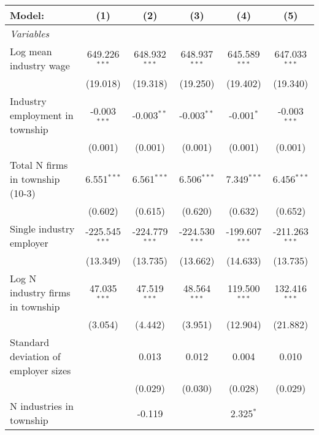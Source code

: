 \begingroup
\centering
\begin{tabular}{lccccc}
   \tabularnewline \midrule \midrule
   Model:                               & (1)              & (2)              & (3)              & (4)              & (5)\\  
   \midrule
   \emph{Variables}\\
   Log mean industry wage               & 649.226$^{***}$  & 648.932$^{***}$  & 648.937$^{***}$  & 645.589$^{***}$  & 647.033$^{***}$\\   
                                        & (19.018)         & (19.318)         & (19.250)         & (19.402)         & (19.340)\\   
   Industry employment in township      & -0.003$^{***}$   & -0.003$^{**}$    & -0.003$^{**}$    & -0.001$^{*}$     & -0.003$^{***}$\\   
                                        & (0.001)          & (0.001)          & (0.001)          & (0.001)          & (0.001)\\   
   Total N firms in township (10-3)     & 6.551$^{***}$    & 6.561$^{***}$    & 6.506$^{***}$    & 7.349$^{***}$    & 6.456$^{***}$\\   
                                        & (0.602)          & (0.615)          & (0.620)          & (0.632)          & (0.652)\\   
   Single industry employer             & -225.545$^{***}$ & -224.779$^{***}$ & -224.530$^{***}$ & -199.607$^{***}$ & -211.263$^{***}$\\   
                                        & (13.349)         & (13.735)         & (13.662)         & (14.633)         & (13.735)\\   
   Log N industry firms in township     & 47.035$^{***}$   & 47.519$^{***}$   & 48.564$^{***}$   & 119.500$^{***}$  & 132.416$^{***}$\\   
                                        & (3.054)          & (4.442)          & (3.951)          & (12.904)         & (21.882)\\   
   Standard deviation of employer sizes &                  & 0.013            & 0.012            & 0.004            & 0.010\\   
                                        &                  & (0.029)          & (0.030)          & (0.028)          & (0.029)\\   
   N industries in township             &                  & -0.119           &                  & 2.325$^{*}$      &   \\   

\end{tabular}
